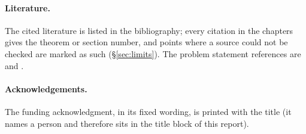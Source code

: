 \paragraph{Literature.} The cited literature is listed in the bibliography; every citation in the chapters gives the
theorem or section number, and points where a source could not be checked are marked as such (\S\ref{sec:limits}). The
problem statement references are \cite{JL} and \cite[Ch.~8]{Bergeron16}.

\paragraph{Acknowledgements.} The funding acknowledgment, in its fixed wording, is printed with the title (it names a person and
therefore sits in the title block of this report).
